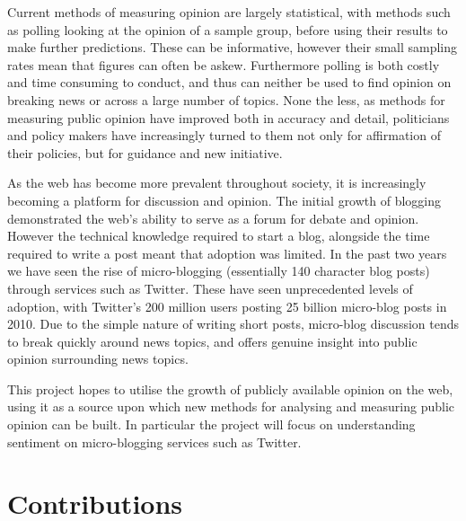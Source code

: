 Current methods of measuring opinion are largely statistical, with methods such as polling looking at the opinion of a sample group, before using their results to make further predictions. These can be informative, however their small sampling rates mean that figures can often be askew. Furthermore polling is both costly and time consuming to conduct, and thus can neither be used to find opinion on breaking news or across a large number of topics. None the less, as methods for measuring public opinion have improved both in accuracy and detail, politicians and policy makers have increasingly turned to them not only for affirmation of their policies, but for guidance and new initiative.

As the web has become more prevalent throughout society, it is increasingly becoming a platform for discussion and opinion. The initial growth of blogging demonstrated the web's ability to serve as a forum for debate and opinion. However the technical knowledge required to start a blog, alongside the time required to write a post meant that adoption was limited. In the past two years we have seen the rise of micro-blogging (essentially 140 character blog posts) through services such as Twitter. These have seen unprecedented levels of adoption, with Twitter's 200 million users posting 25 billion micro-blog posts in 2010. Due to the simple nature of writing short posts, micro-blog discussion tends to break quickly around news topics, and offers genuine insight into public opinion surrounding news topics.

This project hopes to utilise the growth of publicly available opinion on the web, using it as a source upon which new methods for analysing and measuring public opinion can be built. In particular the project will focus on understanding sentiment on micro-blogging services such as Twitter. 

\section{Contributions}

